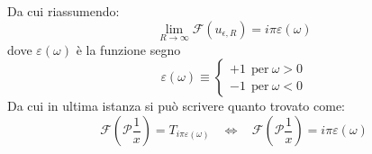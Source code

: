 \documentclass[twoside]{article}
\begin{document}
Da cui riassumendo:
\begin{equation}
    \lim_{R\to \infty}\mathcal{F}(u_{\epsilon,R})=i\pi \varepsilon(\omega)
\end{equation}
dove $\varepsilon(\omega)$ è la funzione segno
\begin{equation}
    \varepsilon(\omega)\equiv \left\{ \begin{array}{lr}
         +1 \ \ \text{per} \ \omega>0  \\
         -1 \ \ \text{per} \ \omega<0  
    \end{array} \right.
\end{equation}
Da cui in ultima istanza si può scrivere quanto trovato come:
\begin{equation}\label{19 P}
    \mathcal{F}\left( \mathscr{P}\frac{1}{x} \right)=T_{i\pi \varepsilon(\omega)} \ \ \ \ \iff \ \ \ \ \mathcal{F}\left( \mathscr{P}\frac{1}{x} \right)=i\pi \varepsilon(\omega)
\end{equation}
\end{document}
